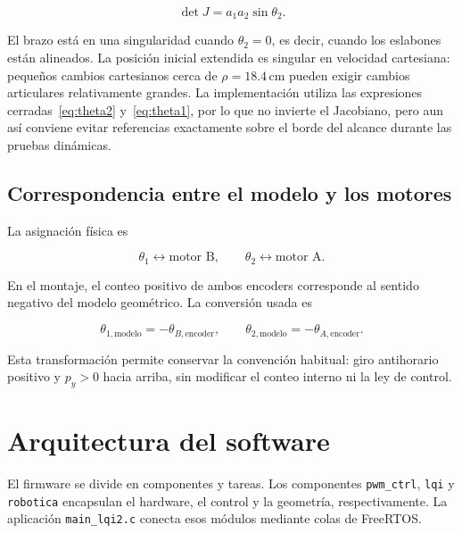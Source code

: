 \documentclass[11pt,a4paper]{article}
\begin{document}
\begin{equation}
\det J=a_1a_2\sin\theta_2.
\end{equation}

El brazo está en una singularidad cuando $\theta_2=0$, es decir, cuando los eslabones están alineados. La posición inicial extendida es singular en velocidad cartesiana: pequeños cambios cartesianos cerca de $\rho=18.4\,\mathrm{cm}$ pueden exigir cambios articulares relativamente grandes. La implementación utiliza las expresiones cerradas~\eqref{eq:theta2} y~\eqref{eq:theta1}, por lo que no invierte el Jacobiano, pero aun así conviene evitar referencias exactamente sobre el borde del alcance durante las pruebas dinámicas.

\subsection{Correspondencia entre el modelo y los motores}

La asignación física es

\begin{equation}
\theta_1\longleftrightarrow\text{motor B},\qquad
\theta_2\longleftrightarrow\text{motor A}.
\end{equation}

En el montaje, el conteo positivo de ambos encoders corresponde al sentido negativo del modelo geométrico. La conversión usada es

\begin{equation}
\theta_{1,\mathrm{modelo}}=-\theta_{B,\mathrm{encoder}},
\qquad
\theta_{2,\mathrm{modelo}}=-\theta_{A,\mathrm{encoder}}.
\end{equation}

Esta transformación permite conservar la convención habitual: giro antihorario positivo y $p_y>0$ hacia arriba, sin modificar el conteo interno ni la ley de control.

\section{Arquitectura del software}

El firmware se divide en componentes y tareas. Los componentes \texttt{pwm\_ctrl}, \texttt{lqi} y \texttt{robotica} encapsulan el hardware, el control y la geometría, respectivamente. La aplicación \texttt{main\_lqi2.c} conecta esos módulos mediante colas de FreeRTOS.
\end{document}
